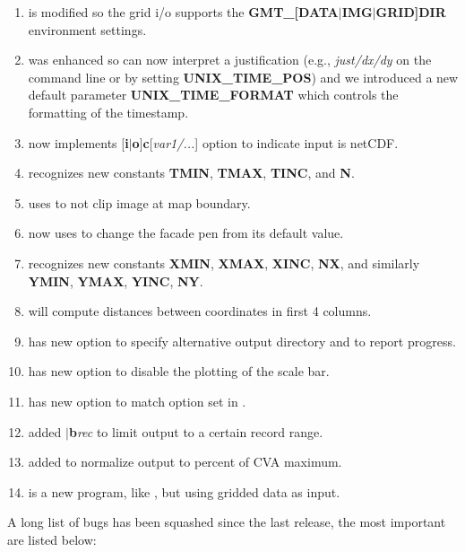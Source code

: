 \begin{enumerate}
\item {} is modified so the grid i/o supports the \textbf{GMT\_[DATA$|$IMG$|$GRID]DIR} environment settings.
\item {} was enhanced so  can now interpret a justification (e.g., \emph{just/dx/dy}
on the command line or by setting \textbf{UNIX\_TIME\_POS}) and we introduced a new default parameter \textbf{UNIX\_TIME\_FORMAT}
which controls the formatting of the timestamp.
\item {} now implements [\textbf{i}$|$\textbf{o}]\textbf{c}[\emph{var1/...}] option to indicate input is netCDF.
\item {} recognizes new constants \textbf{TMIN}, \textbf{TMAX}, \textbf{TINC}, and \textbf{N}.
\item {} uses  to not clip image at map boundary.
\item {} now uses  to change the facade pen from its default value.
\item {} recognizes new constants \textbf{XMIN}, \textbf{XMAX}, \textbf{XINC}, \textbf{NX}, and similarly
\textbf{YMIN}, \textbf{YMAX}, \textbf{YINC}, \textbf{NY}.
\item {}  will compute distances between coordinates in first 4 columns.
\item {} has new option  to specify alternative output directory and  to report progress.
\item {} has new option  to disable the plotting of the scale bar.
\item {} has new option  to match option set in .
\item {}	added $|$\textbf{b}\emph{rec} to limit output to a certain record range.
\item {} added  to normalize output to percent of CVA maximum.
\item {} is a new program, like , but using gridded data as input.
\end{enumerate}

A long list of bugs has been squashed since the last release, the most important are listed below:

